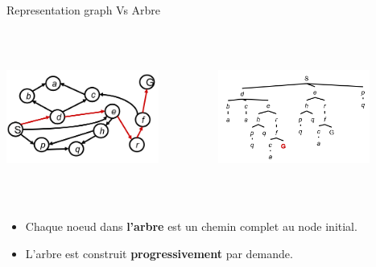 \documentclass{beamer}
\begin{document}
\begin{frame}[t]{Representation graph Vs Arbre}
 \begin{columns}
   \begin{column}{0.5\textwidth}
    \centering 
    \includegraphics[width=5cm,height=5cm]{./images/graph_path_solution.png}
   \end{column}
   \begin{column}{0.5\textwidth}
     \centering
     \includegraphics[width=5cm,height=5cm]{./images/tree_path_solution.png}
   \end{column}
 \end{columns} 
\pause
\begin{itemize}
  \small
\item Chaque noeud dans \textbf{l'arbre} est un chemin \alert{complet} au node initial.
\item L'arbre est construit \textbf{progressivement} par demande. 
\end{itemize}
\end{frame}
\end{document}
